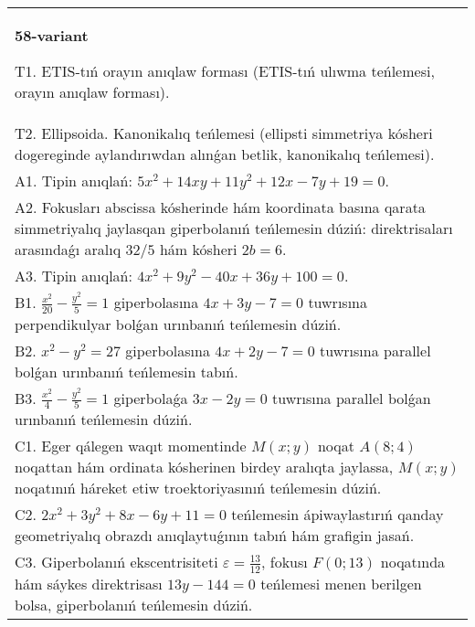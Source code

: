 \documentclass{article}
\begin{document}
\begin{tabular}{m{17cm}}
\textbf{58-variant}
\newline

T1. ETIS-tıń orayın anıqlaw forması (ETIS-tıń ulıwma teńlemesi, orayın anıqlaw forması).\\

T2. Ellipsoida. Kanonikalıq teńlemesi (ellipsti simmetriya kósheri dogereginde aylandırıwdan alınǵan betlik, kanonikalıq teńlemesi).\\

A1. Tipin anıqlań: $5 x^{2}+14 xy+11 y^{2}+12 x-7 y+19=0$.\\

A2. Fokusları abscissa kósherinde hám koordinata basına qarata simmetriyalıq jaylasqan giperbolanıń teńlemesin dúziń: direktrisaları arasındaǵı aralıq $32/5$ hám kósheri $2 b=6$.\\

A3. Tipin anıqlań: $4 x^2+9 y^2-40 x+36 y+100=0$.\\

B1. $\frac{x^{2}}{20} - \frac{y^{2}}{5} = 1$ giperbolasına $4x + 3y - 7 = 0$ tuwrısına perpendikulyar bolǵan urınbanıń teńlemesin dúziń.  \\

B2. $x^{2} - y^{2} = 27$ giperbolasına $4x + 2y - 7 = 0$ tuwrısına parallel bolǵan urınbanıń teńlemesin tabıń.  \\

B3. $\frac{x^{2}}{4} - \frac{y^{2}}{5} = 1$ giperbolaǵa $3x - 2y = 0$ tuwrısına parallel bolǵan urınbanıń teńlemesin dúziń.  \\

C1. Eger qálegen waqıt momentinde $M(x;y)$ noqat $A(8;4)$ noqattan hám ordinata kósherinen birdey aralıqta jaylassa, $M(x;y)$ noqatınıń háreket etiw troektoriyasınıń teńlemesin dúziń.  \\

C2. $2x^{2} + 3y^{2} + 8x - 6y + 11 = 0$ teńlemesin ápiwaylastırıń qanday geometriyalıq obrazdı anıqlaytuǵının tabıń hám grafigin jasań.\\

C3. Giperbolanıń ekscentrisiteti $\varepsilon = \frac{13}{12}$, fokusı $F(0;13)$ noqatında hám sáykes direktrisası $13y - 144 = 0$ teńlemesi menen berilgen bolsa, giperbolanıń teńlemesin dúziń.  \\

\end{tabular}
\vspace{1cm}
\end{document}
